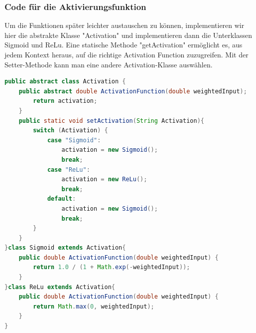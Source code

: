 \documentclass[12pt]{article}
\begin{document}
\subsubsection{Code für die Aktivierungsfunktion}
Um die Funktionen später leichter austauschen zu können, implementieren wir hier die abstrakte Klasse "Activation" und implementieren dann die Unterklassen Sigmoid und ReLu. Eine statische Methode "getActivation" ermöglicht es, aus jedem Kontext heraus, auf die richtige Activation Function zuzugreifen. Mit der Setter-Methode kann man eine andere Activation-Klasse auswählen.\begin{lstlisting}[language=Java]
public abstract class Activation {
    public abstract double ActivationFunction(double weightedInput);    static Activation activation = new Sigmoid();    public static Activation geActivation(){
        return activation;
    }
    public static void setActivation(String Activation){
        switch (Activation) {
            case "Sigmoid":
                activation = new Sigmoid();
                break;
            case "ReLu":
                activation = new ReLu();
                break;
            default:
                activation = new Sigmoid();
                break;
        }
    }
}class Sigmoid extends Activation{
    public double ActivationFunction(double weightedInput) {
        return 1.0 / (1 + Math.exp(-weightedInput));
    }
}class ReLu extends Activation{
    public double ActivationFunction(double weightedInput) {
        return Math.max(0, weightedInput);
    }
}
\end{lstlisting}
\end{document}

